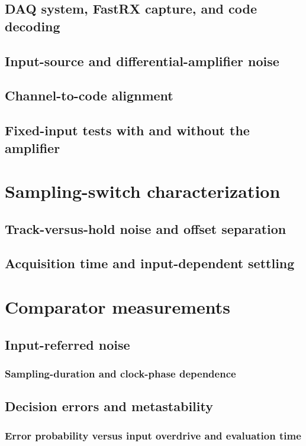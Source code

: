 \documentclass[PhD, UKenglish]{scrbook}
\begin{document}
\subsection{DAQ system, FastRX capture, and code decoding}
\subsection{Input-source and differential-amplifier noise}
\subsection{Channel-to-code alignment}
\subsection{Fixed-input tests with and without the amplifier}

\section{Sampling-switch characterization}
\subsection{Track-versus-hold noise and offset separation}
\subsection{Acquisition time and input-dependent settling}

\section{Comparator measurements}
\subsection{Input-referred noise}
\subsubsection{Sampling-duration and clock-phase dependence}
\subsection{Decision errors and metastability}
\subsubsection{Error probability versus input overdrive and evaluation time}
\end{document}
